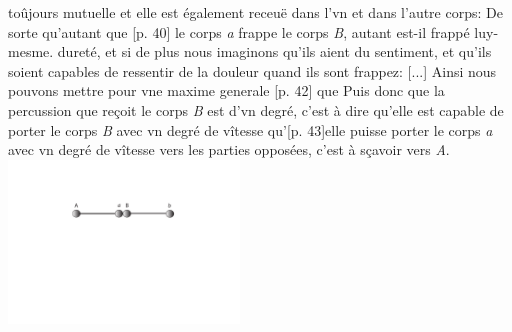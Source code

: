               \noindent {} 
\pend
\count{}
\pstart  
\noindent
to\^{u}jours mutuelle et elle est \'{e}galement receu\"{e} dans l'vn et dans l'autre corps: De sorte qu'autant que [p. 40] le corps \textit{a} frappe le corps \textit{B}, autant est-il frapp\'{e} luy-mesme.  duret\'{e}, et si de plus nous imaginons qu'ils aient du sentiment, et qu'ils soient capables de ressentir de la douleur quand ils sont frappez: [...]
\pend 
\count{}
\pstart  
[p. 41] Ainsi nous pouvons mettre pour vne maxime generale [p. 42] que 
\pend 
\pstart  
[p. 42] Puis donc que la percussion que re\c{c}oit le corps \textit{B} est d'vn degr\'{e}, c'est \`{a} dire qu'elle est capable de porter le corps \textit{B} avec vn degr\'{e} de v\^{i}tesse
 qu'[p. 43]elle puisse porter le corps \textit{a} avec vn degr\'{e} de v\^{i}tesse vers les parties oppos\'{e}es, c'est \`{a} s\c{c}avoir vers \textit{A}.
\pend 
\vspace{1em}
\pstart
\centering
 \noindent \includegraphics[trim = 0mm -3mm 0mm -5mm, clip, width=0.46\textwidth]{images/pardies1670-d2.pdf}\\
